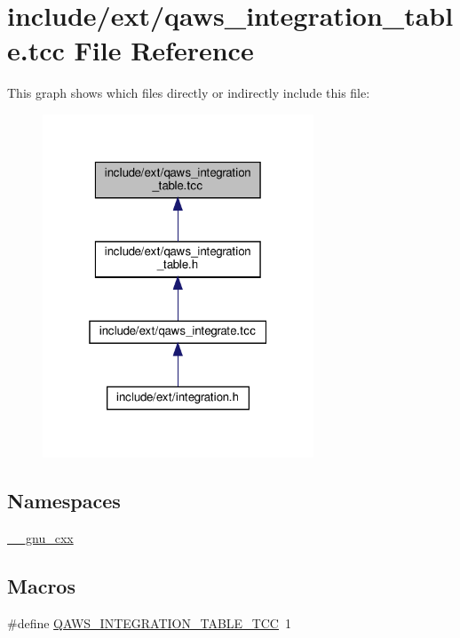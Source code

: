\hypertarget{qaws__integration__table_8tcc}{}\section{include/ext/qaws\+\_\+integration\+\_\+table.tcc File Reference}
\label{qaws__integration__table_8tcc}
This graph shows which files directly or indirectly include this file\+:
\nopagebreak
\begin{figure}[H]
\begin{center}
\leavevmode
\includegraphics[width=229pt]{qaws__integration__table_8tcc__dep__incl}
\end{center}
\end{figure}
\subsection*{Namespaces}
\begin{DoxyCompactItemize}
\item 
 \hyperlink{namespace____gnu__cxx}{\+\_\+\+\_\+gnu\+\_\+cxx}
\end{DoxyCompactItemize}
\subsection*{Macros}
\begin{DoxyCompactItemize}
\item 
\#define \hyperlink{qaws__integration__table_8tcc_aad3fc7230c5300d34a901a04b363dc03}{Q\+A\+W\+S\+\_\+\+I\+N\+T\+E\+G\+R\+A\+T\+I\+O\+N\+\_\+\+T\+A\+B\+L\+E\+\_\+\+T\+CC}~1
\end{DoxyCompactItemize}


